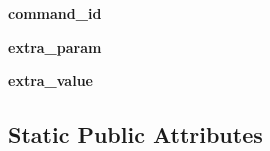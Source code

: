 \begin{DoxyCompactItemize}
{\bfseries command\+\_\+id}
\item 
\mbox{\label{classpymavlink_1_1dialects_1_1v10_1_1MAVLink__digicam__control__message_a8caeeeee1fd263b1293d95ff91168fff}} 
{\bfseries extra\+\_\+param}
\item 
\mbox{\label{classpymavlink_1_1dialects_1_1v10_1_1MAVLink__digicam__control__message_af16cd1756d30a02198e2a6cb933dfeaa}} 
{\bfseries extra\+\_\+value}
\end{DoxyCompactItemize}
\subsection*{Static Public Attributes}
